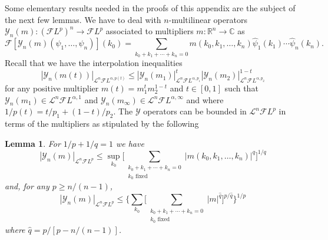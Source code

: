 \documentclass[a4paper,11pt,reqno]{article}
\newcommand{\RR}{\mathbb{R}}
\newcommand{\FF}{\mathcal{F}}
\newcommand{\LL}{\mathcal{L}}
\newcommand{\YY}{\mathcal{Y}}
\newtheorem{lemma}[theorem]{Lemma}
\begin{document}
Some elementary results needed in the proofs of this appendix are the
subject of the next few lemmas.
We have to deal with $n$-multilinear operators $\YY_n(m) : (\FF L^p)^{ n}\to \FF L^p$ associated to multipliers $m:\RR^n\to\mathbb{C}$ as
$$
\FF [\YY_n(m)(\psi_1,\dots,\psi_n)](k_0) = \sum_{k_0+k_1+\cdots+k_n=0} m(k_0,k_1,\dots,k_n) \hat \psi_1(k_1)\cdots \hat \psi_n(k_n) .
$$
Recall that we have the interpolation inequalities
$$
|\YY_n(m(t))|_{\LL^n \FF L^{\alpha,p(t)}} \le |\YY_n(m_1) |_{\LL^n \FF L^{\alpha,p_1}}^{t} |\YY_n(m_2)|_{\LL^n \FF L^{\alpha,p_2}}^{1-t}
$$
for any positive multiplier $m(t) = m_1^t m_2^{1-t}$ and $t\in[0,1]$ such that  $\YY_n(m_1) \in \LL^n \FF L^{\alpha,1}$ and $\YY_n(m_\infty) \in \LL^n\FF L^{\alpha,\infty}$ and where $1/p(t) = t/p_1+(1-t)/p_2$. 
The $\YY$ operators can be bounded   in $\LL^n \FF L^p$ in terms of the multipliers as stipulated  by the following
\begin{lemma}
\label{lemma:op-bound}
For $1/p+1/q=1$ we have
$$
|\YY_n(m)|_{\LL^n\FF L^p}\le \sup_{k_0} \big[\sum_{\substack{k_0+k_1+\cdots+k_n=0\\  k_0 \text{ fixed}}} |m(k_0,k_1,\dots,k_n)|^q \big]^{1/q}
$$
and, for any $p\ge n/(n-1)$,
$$
|\YY_n(m)|_{\LL^n\FF L^p}
\le \big 
\{\sum_{k_0}\big[\sum_{\substack{k_0+k_1+\cdots+k_n=0\\ k_0 \text{ fixed}}} |m|^{\hat q} \big]^{p/\hat q} \big\}^{1/p}
$$
where $\hat q = p/[p-n/(n-1)]$.

\end{lemma}
\end{document}
